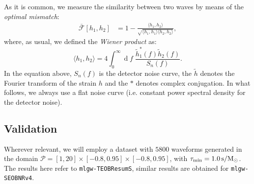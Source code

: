 \documentclass[twocolumn,showpacs,preprintnumbers,nofootinbib,prd,
superscriptaddress,10pt]{revtex4-1}
\renewcommand{\d}[1]{\ensuremath{\operatorname{d}\!{#1}}}
\begin{document}
As it is common, we measure the similarity between two waves by means of the \textit{optimal mismatch}:
\begin{align}
	\bar{\mathcal{F}}[h_1,h_2] & = 1- \frac{\langle h_1, h_2 \rangle}{\sqrt{\langle h_1, h_1 \rangle \langle h_2, h_2 \rangle}}, 	\label{eq:mismatch_def}
\end{align}
where, as usual, we defined the \textit{Wiener product} as:
\begin{equation}
	 {\langle h_1, h_2 \rangle} = 4 \int_0^\infty \d{f} \; \frac{\tilde{h}_1^*(f) \tilde{h}_2(f)}{S_n(f)}.
	\label{ew:Wiener}
\end{equation}
In the equation above, $S_n(f)$ is the detector noise curve, the $\tilde{h}$ denotes the Fourier transform of the 
strain $h$ and the $*$ denotes complex conjugation.
In what follows, we always use a flat noise curve (i.e. constant power spectral density for the detector noise).

\subsection{Validation}
\label{sec:validation}
Wherever relevant, we will employ a dataset with $5800$ waveforms generated in the domain $\mathcal{P} = [1,20]\times[-0.8,0.95]\times[-0.8,0.95]$, with $\tau_{\rm min} = \SI{1.0}{s/M_\odot}$. The results here refer to \texttt{mlgw-TEOBResumS}, similar results are obtained for \texttt{mlgw-SEOBNRv4}.
\end{document}
